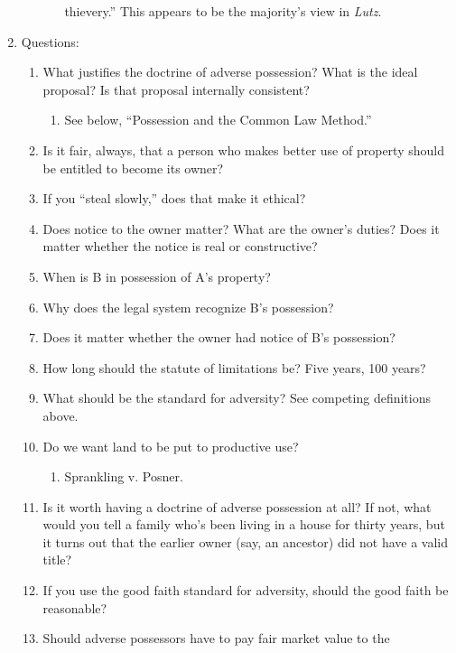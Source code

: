 \begin{enumerate}
\begin{enumerate}
\begin{enumerate}
            thievery.'' This appears to be the majority's view in \emph{Lutz}.
        \end{enumerate}
    \end{enumerate}
    \item Questions:
    \begin{enumerate}
        \item What justifies the doctrine of adverse possession? What is the 
        ideal proposal? Is that proposal internally consistent?
        \begin{enumerate}
            \item See below, ``Possession and the Common Law Method.''
        \end{enumerate}
        \item Is it fair, always, that a person who makes better use of property 
        should be entitled to become its owner?
        \item If you ``steal slowly,'' does that make it ethical?
        \item Does notice to the owner matter? What are the owner's duties? 
        Does it matter whether the notice is real or constructive?
        \item When is B in possession of A's property?
        \item Why does the legal system recognize B's possession?
        \item Does it matter whether the owner had notice of B's possession?
        \item How long should the statute of limitations be? Five years, 100 
        years?
        \item What should be the standard for adversity? See competing 
        definitions above.
        \item Do we want land to be put to productive use?
        \begin{enumerate}
            \item Sprankling v. Posner.
        \end{enumerate}
        \item Is it worth having a doctrine of adverse possession at all? If 
        not, what would you tell a family who's been living in a house for 
        thirty years, but it turns out that the earlier owner (say, an 
        ancestor) did not have a valid title?
        \item If you use the good faith standard for adversity, should the 
        good faith be reasonable?
        \item Should adverse possessors have to pay fair market value to the 

\end{enumerate}
\end{enumerate}
